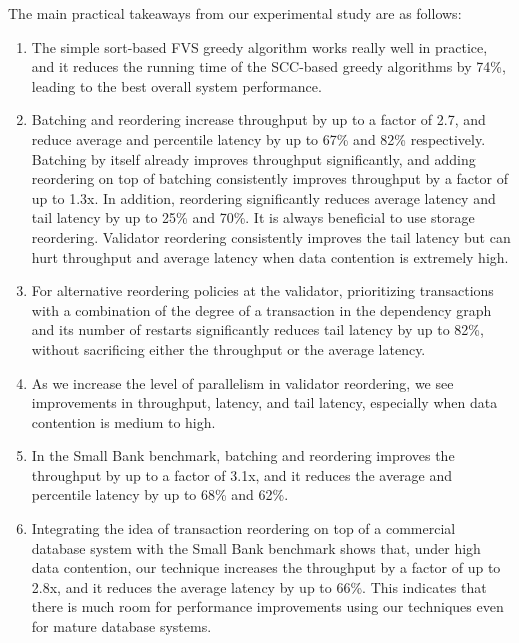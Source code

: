 The main practical takeaways from our experimental study are as follows:
\vspace{-.5em}
\begin{enumerate}[leftmargin=*]
\item The simple sort-based FVS greedy algorithm works really well in practice, and it reduces the running time of the SCC-based greedy algorithms by 74\%, leading to the best overall system performance. 
\vspace{-0.5em}
\item Batching and reordering increase throughput by up to a factor of 2.7, and reduce average and percentile latency by up to 67\% and 82\% respectively.
Batching by itself already improves throughput significantly, and adding reordering on top of batching consistently improves throughput by a factor of up to 1.3x. In addition, reordering significantly reduces average latency and tail latency by up to 25\% and 70\%. It is always beneficial to use storage reordering. Validator reordering consistently improves the tail latency but can hurt throughput and average latency when data contention is extremely high.
\vspace{-0.5em}
\item For alternative reordering policies at the validator, prioritizing transactions with a combination of the degree of a transaction in the dependency graph and its number of restarts significantly reduces tail latency by up to 82\%, without sacrificing either the throughput or the average latency.
\vspace{-0.5em}
\item As we increase the level of parallelism in validator reordering, we see improvements in throughput, latency, and tail latency, especially when data contention is medium to high.
\vspace{-0.5em}
\item In the Small Bank benchmark, batching and reordering improves the throughput by up to a factor of 3.1x, and it reduces the average and percentile latency by up to 68\% and 62\%.
\vspace{-0.5em}
\item Integrating the idea of transaction reordering on top of a commercial database system with the Small Bank benchmark shows that, under high data contention, our technique increases the throughput by a factor of up to 2.8x, and it reduces the average latency by up to 66\%. This indicates that there is much room for performance improvements using our techniques even for mature database systems.
\end{enumerate}  
